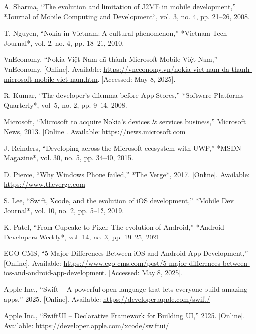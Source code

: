 \documentclass[12pt]{report}
\begin{document}
\begin{thebibliography}{1}
  A. Sharma, ``The evolution and limitation of J2ME in mobile development,'' *Journal of Mobile Computing and Development*, vol. 3, no. 4, pp. 21–26, 2008.


  T. Nguyen, ``Nokia in Vietnam: A cultural phenomenon,'' *Vietnam Tech Journal*, vol. 2, no. 4, pp. 18–21, 2010.

  VnEconomy, “Nokia Việt Nam đã thành Microsoft Mobile Việt Nam,” VnEconomy, [Online]. Available: \url{https://vneconomy.vn/nokia-viet-nam-da-thanh-microsoft-mobile-viet-nam.htm}. [Accessed: May 8, 2025].


  R. Kumar, ``The developer’s dilemma before App Stores,'' *Software Platforms Quarterly*, vol. 5, no. 2, pp. 9–14, 2008.

  Microsoft, ``Microsoft to acquire Nokia’s devices \& services business,'' Microsoft News, 2013. [Online]. Available: \url{https://news.microsoft.com}

  J. Reinders, ``Developing across the Microsoft ecosystem with UWP,'' *MSDN Magazine*, vol. 30, no. 5, pp. 34–40, 2015.

  D. Pierce, ``Why Windows Phone failed,'' *The Verge*, 2017. [Online]. Available: \url{https://www.theverge.com}

  S. Lee, ``Swift, Xcode, and the evolution of iOS development,'' *Mobile Dev Journal*, vol. 10, no. 2, pp. 5–12, 2019.

  K. Patel, ``From Cupcake to Pixel: The evolution of Android,'' *Android Developers Weekly*, vol. 14, no. 3, pp. 19–25, 2021.

  EGO CMS, “5 Major Differences Between iOS and Android App Development,” [Online]. Available: \url{https://www.ego-cms.com/post/5-major-differences-between-ios-and-android-app-development}. [Accessed: May 8, 2025].



  Apple Inc., ``Swift – A powerful open language that lets everyone build amazing apps,'' 2025. [Online]. Available: \url{https://developer.apple.com/swift/}

  Apple Inc., ``SwiftUI – Declarative Framework for Building UI,'' 2025. [Online]. Available: \url{https://developer.apple.com/xcode/swiftui/}


\end{thebibliography}
\end{document}
